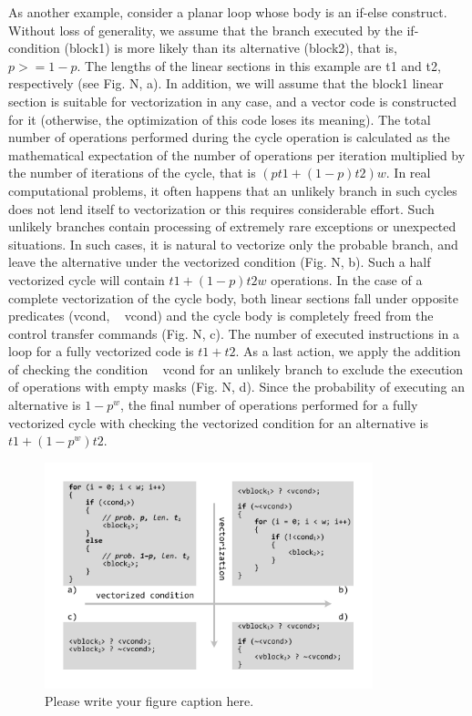 \documentclass[
11pt,%
tightenlines,%
twoside,%
onecolumn,%
nofloats,%
nobibnotes,%
nofootinbib,%
superscriptaddress,%
noshowpacs,%
centertags]%
{revtex4}
\begin{document}
As another example, consider a planar loop whose body is an if-else construct. Without loss of generality, we assume that the branch executed by the if-condition (block1) is more likely than its alternative (block2), that is, $p> = 1 - p$. The lengths of the linear sections in this example are t1 and t2, respectively (see Fig. N, a). In addition, we will assume that the block1 linear section is suitable for vectorization in any case, and a vector code is constructed for it (otherwise, the optimization of this code loses its meaning). The total number of operations performed during the cycle operation is calculated as the mathematical expectation of the number of operations per iteration multiplied by the number of iterations of the cycle, that is $(pt1 + (1 - p) t2) w$. In real computational problems, it often happens that an unlikely branch in such cycles does not lend itself to vectorization or this requires considerable effort. Such unlikely branches contain processing of extremely rare exceptions or unexpected situations. In such cases, it is natural to vectorize only the probable branch, and leave the alternative under the vectorized condition (Fig. N, b). Such a half vectorized cycle will contain $t1 + (1 - p) t2w$ operations. In the case of a complete vectorization of the cycle body, both linear sections fall under opposite predicates (vcond, ~ vcond) and the cycle body is completely freed from the control transfer commands (Fig. N, c). The number of executed instructions in a loop for a fully vectorized code is $t1 + t2$. As a last action, we apply the addition of checking the condition ~ vcond for an unlikely branch to exclude the execution of operations with empty masks (Fig. N, d). Since the probability of executing an alternative is $1 - p ^ w$, the final number of operations performed for a fully vectorized cycle with checking the vectorized condition for an alternative is $t1 + (1 - p ^ w) t2$.

\begin{figure}[h]
\setcaptionmargin{5mm}
\onelinecaptionstrue  %
\includegraphics[width=0.85\textwidth]{pics/if_else_vectorization.pdf}
\caption{Please write your figure caption here.}\label{fig:1}
\end{figure}
\end{document}
